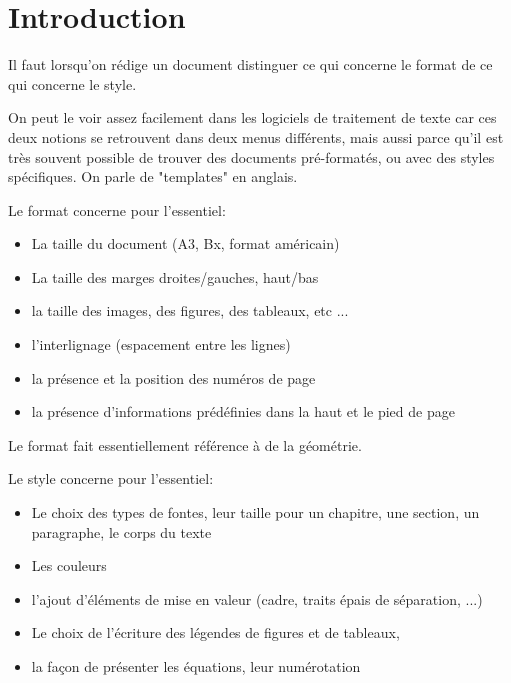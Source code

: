
\section{Introduction}





Il faut lorsqu'on rédige un document distinguer ce qui concerne le format de ce qui concerne le style.

On peut le voir assez facilement dans les logiciels de traitement de texte car ces deux notions se retrouvent dans deux menus différents, mais aussi parce qu'il est
très souvent possible de trouver des documents pré-formatés, ou avec des styles spécifiques. On parle de "templates" en anglais.


Le format concerne pour l'essentiel:
\begin{itemize}
\item La taille du document (A3, Bx, format américain)
\item La taille des marges droites/gauches, haut/bas
\item la taille des images, des figures, des tableaux, etc ...
\item l'interlignage (espacement entre les lignes)
\item la présence et la position des numéros de page
\item la présence d'informations prédéfinies dans la haut et le pied de page
\end{itemize}
Le format fait essentiellement référence à de la géométrie. 



Le style concerne pour l'essentiel:

\begin{itemize}
\item Le choix des types de fontes, leur taille pour un chapitre, une section, un paragraphe, le corps du texte
\item Les couleurs
\item l'ajout d'éléments de mise en valeur (cadre, traits épais de séparation, ...)
\item Le choix de l'écriture des légendes de figures et de tableaux,
\item la façon de présenter les équations, leur numérotation
\end{itemize}




